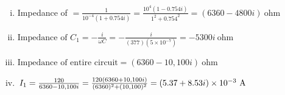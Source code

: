 \begin{enumerate}[(i)]
\item Impedance of 
         $=\frac{1}{10^{-4}(1+0.754i)}
          =\frac{10^4(1-0.754i)}{1^2+0.754^2}
          = (6360-4800i)\ \text{ohm}$

\item $\text{Impedance of $C_1$} = -\frac{i}{\omega C}
               = -\frac{i}{(377)(5\times 10^{-7})}
               = -5300i\ \text{ohm}$

\item $\text{Impedance of entire circuit} = (6360-10,100i)\ \text{ohm}$

\item $I_1 = \frac{120}{6360-10,100i} = \frac{120(6360+10,100i)}{(6360)^2+(10,100)^2}
           = (5.37+8.53i)\times 10^{-3}\ \textup{A}$

\end{enumerate}

